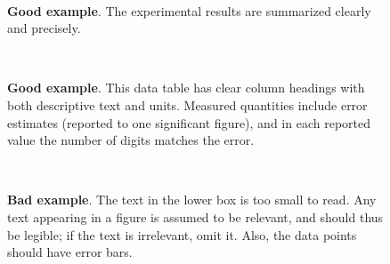 \documentclass[11pt,a4paper]{article}
\begin{document}
\begin{figure}[h]
  \centering
  \\
  \caption{\small \textbf{Good example}.  The experimental results are
    summarized clearly and precisely.}
\end{figure}

\begin{figure}
  \centering
   \\
  \caption{\small \textbf{Good example}.  This data table has clear
    column headings with both descriptive text and units. Measured
    quantities include error estimates (reported to one significant
    figure), and in each reported value the number of digits matches
    the error. }
\end{figure}


\begin{figure}
  \centering
   \\
  \caption{\small \textbf{Bad example}.  The text in the lower box is
    too small to read.  Any text appearing in a figure is assumed to
    be relevant, and should thus be legible; if the text is
    irrelevant, omit it.  Also, the data points should have error
    bars.}
\end{figure}
\end{document}
